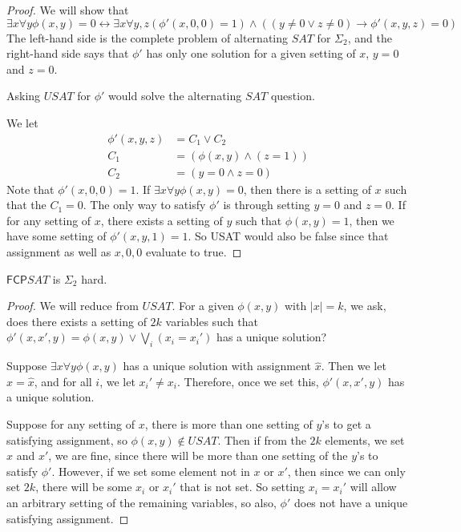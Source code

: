 \documentclass[runningheads,a4paper]{llncs}
\begin{document}
\begin{proof}
We will show that 
\[ \exists x \forall y \phi(x,y) = 0 \leftrightarrow \exists x \forall y, z \left(\phi'(x, 0, 0) = 1 \right) \wedge \left((y \neq 0 \vee z \neq 0 ) \rightarrow \phi'(x, y, z) = 0 \right) \]
The left-hand side is the complete problem of alternating $SAT$ for $\Sigma_2$, and the right-hand side says that $\phi'$ has only one solution for a given setting of $x$, $y=0$ and $z =0$. 

Asking $USAT$ for $\phi'$ would solve the alternating $SAT$ question. 

We let 
\begin{align}
\phi'(x, y, z) &= C_1 \vee C_2 \\
		    C_1 &=\left(\phi(x, y) \wedge (z = 1)\right) \\
		   C_2 &=  \left( y = 0 \wedge z = 0 \right) 
\end{align}
Note that $\phi'(x, 0, 0) = 1$. If $\exists x \forall y \phi(x, y)= 0$, then there is a setting of $x$ such that the $C_1 = 0$. The only way to satisfy $\phi'$ is through setting $y = 0$ and $z = 0$. If for any setting of $x$, there exists a setting of $y$ such that $\phi(x, y) = 1$, then we have some setting of $\phi'(x, y, 1) = 1$. So USAT would also be false since that assignment as well as $x, 0, 0$ evaluate to true.
\end{proof}

\begin{proposition}
\label{prop:fcpsatsigmacomp}
$\mathsf{FCP} SAT$ is $\Sigma_2$ hard.
\end{proposition}

\begin{proof}
We will reduce from $USAT$. For a given $\phi(x, y)$ with $|x| = k$, we ask, does there exists a setting of $2k$ variables such that $\phi'(x, x', y) = \phi(x, y) \vee \bigvee_i (x_i = x_i')$ has a unique solution?

Suppose $\exists x \forall y \phi(x,y)$ has a unique solution with assignment $\hat{x}$. Then we let $x = \hat{x}$, and for all $i$, we let $x_i' \neq x_i$. Therefore, once we set this, $\phi'(x, x', y)$ has a unique solution. 

Suppose for any setting of $x$, there is more than one setting of $y$'s to get a satisfying assignment, so $\phi(x, y) \notin USAT$. Then if from the $2k$ elements, we set $x$ and $x'$, we are fine, since there will be more than one setting of the $y$'s to satisfy $\phi'$. However, if we set some element not in $x$ or $x'$, then since we can only set $2k$, there will be some $x_i$ or $x_i'$ that is not set. So setting $x_i = x_i'$ will allow an arbitrary setting of the remaining variables, so also, $\phi'$ does not have a unique satisfying assignment.
\end{proof}
\end{document}
